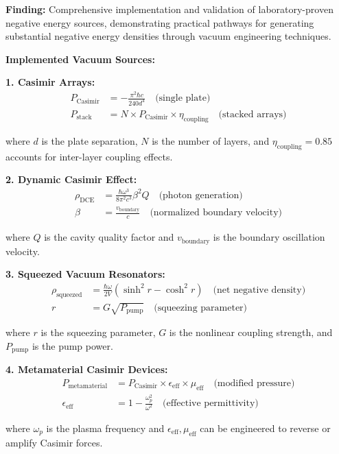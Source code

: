 \documentclass[11pt]{article}
\begin{document}
\textbf{Finding:} Comprehensive implementation and validation of laboratory-proven negative energy sources, demonstrating practical pathways for generating substantial negative energy densities through vacuum engineering techniques.

\textbf{Implemented Vacuum Sources:}

\textbf{1. Casimir Arrays:}
\begin{align}
P_{\text{Casimir}} &= -\frac{\pi^2 \hbar c}{240 d^4} \quad \text{(single plate)} \\
P_{\text{stack}} &= N \times P_{\text{Casimir}} \times \eta_{\text{coupling}} \quad \text{(stacked arrays)}
\end{align}

where $d$ is the plate separation, $N$ is the number of layers, and $\eta_{\text{coupling}} = 0.85$ accounts for inter-layer coupling effects.

\textbf{2. Dynamic Casimir Effect:}
\begin{align}
\rho_{\text{DCE}} &= \frac{\hbar \omega^3}{8\pi^2 c^3} \beta^2 Q \quad \text{(photon generation)} \\
\beta &= \frac{v_{\text{boundary}}}{c} \quad \text{(normalized boundary velocity)}
\end{align}

where $Q$ is the cavity quality factor and $v_{\text{boundary}}$ is the boundary oscillation velocity.

\textbf{3. Squeezed Vacuum Resonators:}
\begin{align}
\rho_{\text{squeezed}} &= \frac{\hbar \omega}{2V} \left(\sinh^2 r - \cosh^2 r\right) \quad \text{(net negative density)} \\
r &= G \sqrt{P_{\text{pump}}} \quad \text{(squeezing parameter)}
\end{align}

where $r$ is the squeezing parameter, $G$ is the nonlinear coupling strength, and $P_{\text{pump}}$ is the pump power.

\textbf{4. Metamaterial Casimir Devices:}
\begin{align}
P_{\text{metamaterial}} &= P_{\text{Casimir}} \times \epsilon_{\text{eff}} \times \mu_{\text{eff}} \quad \text{(modified pressure)} \\
\epsilon_{\text{eff}} &= 1 - \frac{\omega_p^2}{\omega^2} \quad \text{(effective permittivity)}
\end{align}

where $\omega_p$ is the plasma frequency and $\epsilon_{\text{eff}}, \mu_{\text{eff}}$ can be engineered to reverse or amplify Casimir forces.
\end{document}
